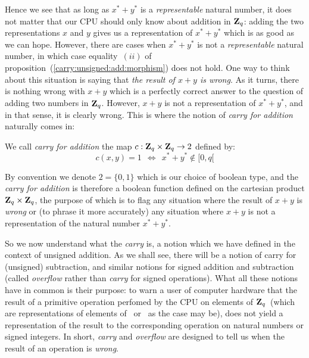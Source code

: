 \documentclass{article}
\newcommand{\zq}{\mbox{${\bf Z}_{q}$}}
\begin{document}
Hence we see that as long as $x^{*}+y^{*}$ is a {\em representable} natural
number, it does not matter that our CPU should only know about addition in \zq:
adding the two representations $x$ and $y$ gives us a representation of 
$x^{*}+y^{*}$ which is as good as we can hope. However, there are cases 
when $x^{*} + y^{*}$ is not a {\em representable} natural number, in which 
case equality~$(ii)$ of proposition~(\ref{carry:unsigned:add:morphism}) 
does not hold. One way to think about this situation is saying that 
{\em the result of $x+y$ is wrong}. As it turns, there is nothing wrong 
with $x+y$ which is a perfectly correct answer to the question of adding 
two numbers in \zq. However, $x+y$ is not a representation of $x^{*}+y^{*}$, 
and in that sense, it is clearly wrong. This is where the notion of 
{\em carry for addition} naturally comes in:

\begin{defin}\label{carry:unsigned:add:carry}
We call {\em carry for addition} the map $c:\zq\times\zq\rightarrow2$ defined by:
  \[
    c(x,y) = 1  \ \ \Leftrightarrow\ \ x^{*} + y^{*} \not\in[0,q[
  \]
\end{defin}

By convention we denote $2=\{0,1\}$ which is our choice of boolean type, 
and the {\em carry for addition} is therefore a boolean function defined 
on the cartesian product $\zq\times\zq$, the purpose of which
is to flag any situation where the result of $x+y$ is {\em wrong} or (to
phrase it more accurately) any situation where $x+y$ is not a representation 
of the natural number $x^{*}+y^{*}$. 

So we now understand what the {\em carry} is, a notion which we have defined 
in the context of unsigned addition. As we shall see, there will be a notion 
of carry for (unsigned) subtraction, and similar notions for signed addition 
and subtraction (called {\em overflow} rather than {\em carry} for signed 
operations). What all these notions have in common is their purpose: 
to warn a user of computer hardware that the result of a primitive operation 
perfomed by the CPU on elements of \zq\ (which are representations of elements
of \N\ or \Z\ as the case may be), does not yield a representation of the result 
to the corresponding operation on natural numbers or signed integers. In short, 
{\em carry} and {\em overflow} are designed to tell us when the result of an
operation is {\em wrong}.
\end{document}
